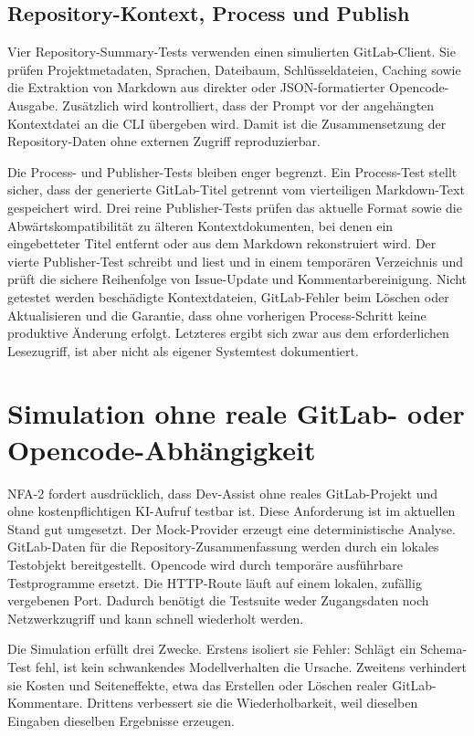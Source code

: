 \subsection{Repository-Kontext, Process und Publish}

Vier Repository-Summary-Tests verwenden einen simulierten GitLab-Client. Sie prüfen Projektmetadaten, Sprachen, Dateibaum, Schlüsseldateien, Caching sowie die Extraktion von Markdown aus direkter oder JSON-formatierter Opencode-Ausgabe. Zusätzlich wird kontrolliert, dass der Prompt vor der angehängten Kontextdatei an die CLI übergeben wird. Damit ist die Zusammensetzung der Repository-Daten ohne externen Zugriff reproduzierbar.

Die Process- und Publisher-Tests bleiben enger begrenzt. Ein Process-Test stellt sicher, dass der generierte GitLab-Titel getrennt vom vierteiligen Markdown-Text gespeichert wird. Drei reine Publisher-Tests prüfen das aktuelle Format sowie die Abwärtskompatibilität zu älteren Kontextdokumenten, bei denen ein eingebetteter Titel entfernt oder aus dem Markdown rekonstruiert wird. Der vierte Publisher-Test schreibt und liest  und  in einem temporären Verzeichnis und prüft die sichere Reihenfolge von Issue-Update und Kommentarbereinigung. Nicht getestet werden beschädigte Kontextdateien, GitLab-Fehler beim Löschen oder Aktualisieren und die Garantie, dass ohne vorherigen Process-Schritt keine produktive Änderung erfolgt. Letzteres ergibt sich zwar aus dem erforderlichen Lesezugriff, ist aber nicht als eigener Systemtest dokumentiert.

\section{Simulation ohne reale GitLab- oder Opencode-Abhängigkeit}

NFA-2 fordert ausdrücklich, dass Dev-Assist ohne reales GitLab-Projekt und ohne kostenpflichtigen KI-Aufruf testbar ist. Diese Anforderung ist im aktuellen Stand gut umgesetzt. Der Mock-Provider erzeugt eine deterministische Analyse. GitLab-Daten für die Repository-Zusammenfassung werden durch ein lokales Testobjekt bereitgestellt. Opencode wird durch temporäre ausführbare Testprogramme ersetzt. Die HTTP-Route läuft auf einem lokalen, zufällig vergebenen Port. Dadurch benötigt die Testsuite weder Zugangsdaten noch Netzwerkzugriff und kann schnell wiederholt werden.

Die Simulation erfüllt drei Zwecke. Erstens isoliert sie Fehler: Schlägt ein Schema-Test fehl, ist kein schwankendes Modellverhalten die Ursache. Zweitens verhindert sie Kosten und Seiteneffekte, etwa das Erstellen oder Löschen realer GitLab-Kommentare. Drittens verbessert sie die Wiederholbarkeit, weil dieselben Eingaben dieselben Ergebnisse erzeugen.

